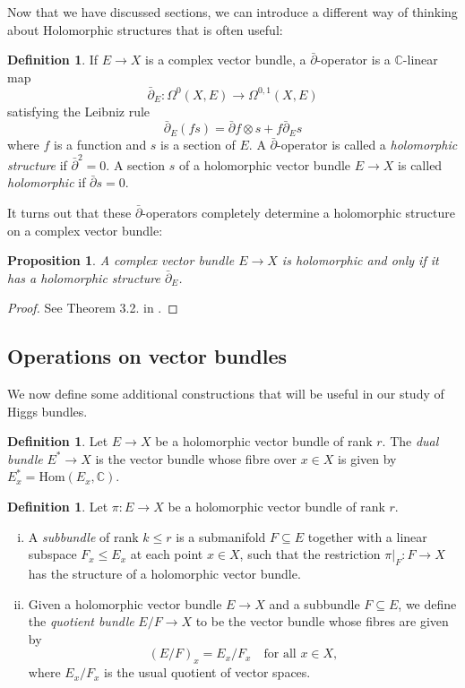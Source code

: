 \documentclass[10pt]{amsart}
\numberwithin{equation}{section}
\newcommand{\C}{\mathbb{C}}
\newcommand{\Hom}{\mathrm{Hom}}
\theoremstyle{plain}
\newtheorem{prop}[thm]{Proposition}
\theoremstyle{definition}
\newtheorem{defn}[thm]{Definition}
\theoremstyle{remark}
\begin{document}
Now that we have discussed sections, we can introduce a different way of thinking about Holomorphic structures that is often useful:

\begin{defn}
    If $E \to X$ is a complex vector bundle, a $\bar{\partial}$-operator is a $\C$-linear map
    \[\bar{\partial}_E: \Omega^0(X, E) \to \Omega^{0,1}(X, E)\]
    satisfying the Leibniz rule
    \[\bar{\partial}_E(fs) = \bar{\partial}f \otimes s + f \bar{\partial}_E s\]
    where $f$ is a function and $s$ is a section of $E$. A $\bar{\partial}$-operator is called a \emph{holomorphic structure} if $\bar{\partial}^2 = 0$. A section $s$ of a holomorphic vector bundle $E \to X$ is called \emph{holomorphic} if $\bar{\partial}s = 0$.
\end{defn}

It turns out that these $\bar{\partial}$-operators completely determine a holomorphic structure on a complex vector bundle:
\begin{prop}
    A complex vector bundle $E \to X$ is holomorphic and only if it has a holomorphic structure $\bar{\partial}_E$.
\end{prop}
\begin{proof}
See Theorem 3.2. in \cite{moroianu2006}.
\end{proof}

\subsection{Operations on vector bundles} We now define some additional constructions that will be useful in our study of Higgs bundles. 

\begin{defn}
Let $E \to X$ be a holomorphic vector bundle of rank $r$. The \emph{dual bundle} $E^* \to X$ is the vector bundle whose fibre over $x \in X$ is given by $E_x^* = \Hom(E_x, \C)$.
\end{defn}

\begin{defn} Let $\pi: E \to X$ be a holomorphic vector bundle of rank $r$.
\begin{enumerate}[(i)]
    \item A \emph{subbundle} of rank $k \le r$ is a submanifold $F \subseteq E$ together with a linear subspace $F_x \le E_x$ at each point $x \in X$, such that the restriction $\pi|_F : F \to X$ has the structure of a holomorphic vector bundle.

    \item Given a holomorphic vector bundle $E\to X$ and a subbundle $F\subseteq E$, we define the \emph{quotient bundle} $E/F \to X$ to be the vector bundle whose fibres are given by 
        \[(E/F)_x = E_x/F_x \quad \text{for all } x \in X,\]
    where $E_x/F_x$ is the usual quotient of vector spaces.
\end{enumerate}
\end{defn}
\end{document}
